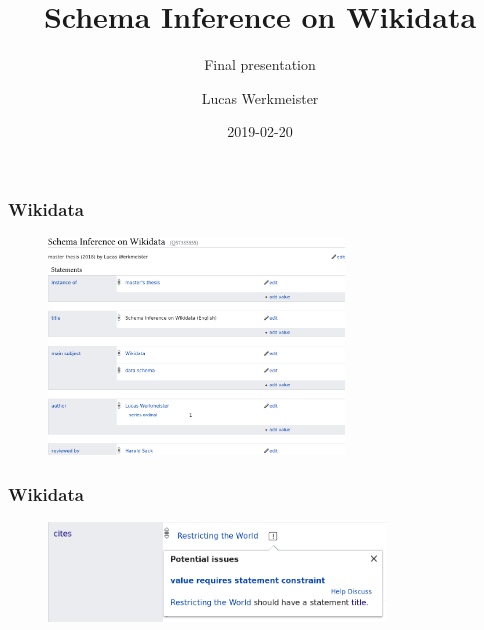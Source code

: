 \documentclass[aspectratio=169]{beamer}
\title{Schema Inference on Wikidata}
\subtitle{Final presentation}
\author{Lucas Werkmeister}
\date{2019-02-20}
\begin{document}
\frame{\titlepage}

\begin{frame}
  \frametitle{Wikidata}
  \begin{figure}
    \includegraphics[width=0.7\textwidth]{item}
  \end{figure}
\end{frame}

\begin{frame}
  \frametitle{Wikidata}
  \begin{figure}
    \includegraphics[width=0.8\textwidth]{constraint}
  \end{figure}
\end{frame}
\end{document}
